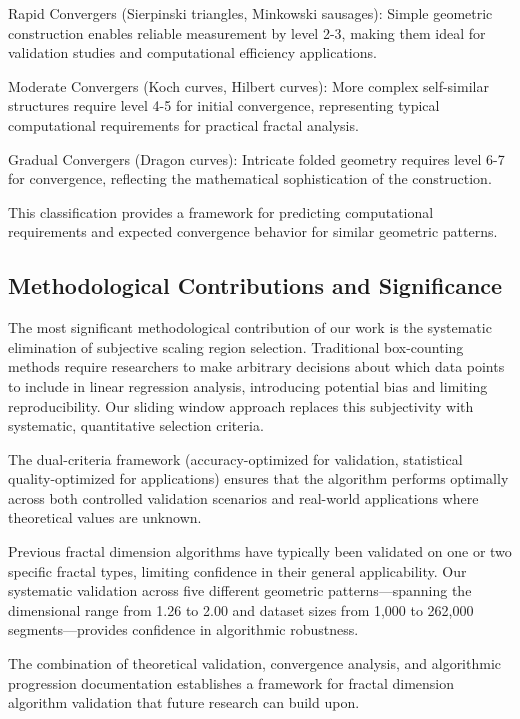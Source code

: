 \documentclass[preprint,12pt]{elsarticle}
\def\textbf#1{#1}%
\begin{document}
\textbf{Rapid Convergers} (Sierpinski triangles, Minkowski sausages): Simple geometric construction enables reliable measurement by level 2-3, making them ideal for validation studies and computational efficiency applications.

\textbf{Moderate Convergers} (Koch curves, Hilbert curves): More complex self-similar structures require level 4-5 for initial convergence, representing typical computational requirements for practical fractal analysis.

\textbf{Gradual Convergers} (Dragon curves): Intricate folded geometry requires level 6-7 for convergence, reflecting the mathematical sophistication of the construction.

This classification provides a framework for predicting computational requirements and expected convergence behavior for similar geometric patterns.

\subsection{Methodological Contributions and Significance}

The most significant methodological contribution of our work is the systematic elimination of subjective scaling region selection. Traditional box-counting methods require researchers to make arbitrary decisions about which data points to include in linear regression analysis, introducing potential bias and limiting reproducibility. Our sliding window approach replaces this subjectivity with systematic, quantitative selection criteria.

The dual-criteria framework (accuracy-optimized for validation, statistical quality-optimized for applications) ensures that the algorithm performs optimally across both controlled validation scenarios and real-world applications where theoretical values are unknown.

Previous fractal dimension algorithms have typically been validated on one or two specific fractal types, limiting confidence in their general applicability. Our systematic validation across five different geometric patterns—spanning the dimensional range from 1.26 to 2.00 and dataset sizes from 1,000 to 262,000 segments—provides confidence in algorithmic robustness.

The combination of theoretical validation, convergence analysis, and algorithmic progression documentation establishes a framework for fractal dimension algorithm validation that future research can build upon.
\end{document}

